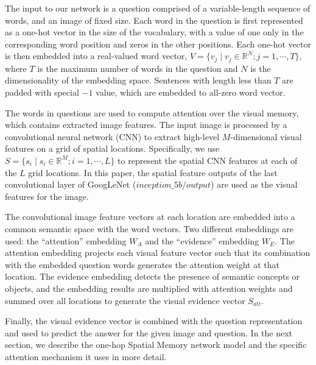 The input to our network is a question comprised of a variable-length sequence of words, and an image of fixed size.
Each word in the question is first represented as a one-hot vector in the size of the vocabulary, with a value of one only in the corresponding word position and zeros in the other positions. Each one-hot vector is then embedded into a real-valued word vector, $V=\{v_j \;|\;v_j\in \mathbb{R}^N; j=1,\cdots,T\}$, where $T$ is the maximum number of words in the question and $N$ is the dimensionality of the embedding space. Sentences with length less than $T$ are padded with special \textbf{$-1$} value, which are embedded to all-zero word vector.

The words in questions are used to compute attention over the visual memory, which contains extracted image features. The input image is processed by a convolutional neural network (CNN) to extract high-level $M$-dimensional visual features on a grid of spatial locations. 
Specifically, we use $S=\{s_i \;|\;s_i\in \mathbb{R}^M; i=1,\cdots,L\}$ to represent the spatial CNN features at each of the $L$ grid locations. In this paper, the spatial feature outputs of the last convolutional layer of GoogLeNet ($inception\_5b/output$) \cite{googlenet} are used as the visual features for the image. 

The convolutional image feature vectors at each location are  embedded into a common semantic space with the word vectors.
Two different embeddings are used: the ``attention'' embedding $W_A$ and the ``evidence'' embedding $W_E$. 
The attention embedding projects each visual feature vector such that its combination with the embedded question words generates the attention weight at that location. The evidence embedding detects the presence of semantic concepts or objects, and the embedding results are multiplied with attention weights and summed over all locations to generate the visual evidence vector $S_{att}$. 

Finally, the visual evidence vector is combined with the question representation and used to predict the answer for the given image and question.
In the next section, we describe the one-hop Spatial Memory network model and the specific attention mechanism it uses in more detail. 

